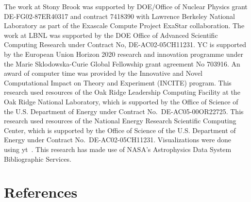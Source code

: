 \documentclass[a4paper]{jpconf}
\begin{document}
\ack The work at Stony Brook was supported by DOE/Office of Nuclear
Physics grant DE-FG02-87ER40317 and contract 7418390 with Lawrence
Berkeley National Laboratory as part of the Exascale Compute Project
ExaStar collaboration.  The work at LBNL was supported by the DOE
Office of Advanced Scientific Computing Research under Contract No,
DE-AC02-05CH11231. YC is supported by the European Union Horizon 2020
research and innovation programme under the Marie Sklodowska-Curie
Global Fellowship grant agreement No 703916.  An award of computer
time was provided by the Innovative and Novel Computational Impact on
Theory and Experiment (INCITE) program. This research used resources
of the Oak Ridge Leadership Computing Facility at the Oak Ridge
National Laboratory, which is supported by the Office of Science of
the U.S. Department of Energy under Contract No.\ DE-AC05-00OR22725.
This research used resources of the National Energy Research
Scientific Computing Center, which is supported by the Office of
Science of the U.S. Department of Energy under Contract
No.\ DE-AC02-05CH11231.  Visualizations were done using yt~\cite{yt}.
This research has made use of NASA's Astrophysics Data System
Bibliographic Services.


\section*{References}



\end{document}
